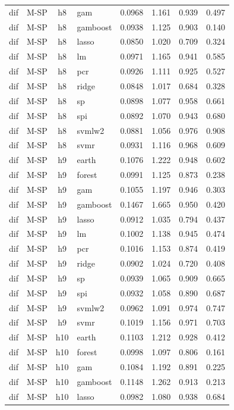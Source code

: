 \begin{ThreePartTable}
\begin{longtable}[t]{llclcccc}
dif & M-SP & h8 & gam & 0.0968 & 1.161 & 0.939 & 0.497\\
dif & M-SP & h8 & gamboost & 0.0938 & 1.125 & 0.903 & 0.140\\
dif & M-SP & h8 & lasso & 0.0850 & 1.020 & 0.709 & 0.324\\
dif & M-SP & h8 & lm & 0.0971 & 1.165 & 0.941 & 0.585\\
dif & M-SP & h8 & pcr & 0.0926 & 1.111 & 0.925 & 0.527\\
dif & M-SP & h8 & ridge & 0.0848 & 1.017 & 0.684 & 0.328\\
dif & M-SP & h8 & sp & 0.0898 & 1.077 & 0.958 & 0.661\\
dif & M-SP & h8 & spi & 0.0892 & 1.070 & 0.943 & 0.680\\
dif & M-SP & h8 & svmlw2 & 0.0881 & 1.056 & 0.976 & 0.908\\
dif & M-SP & h8 & svmr & 0.0931 & 1.116 & 0.968 & 0.609\\
\addlinespace
dif & M-SP & h9 & earth & 0.1076 & 1.222 & 0.948 & 0.602\\
dif & M-SP & h9 & forest & 0.0991 & 1.125 & 0.873 & 0.238\\
dif & M-SP & h9 & gam & 0.1055 & 1.197 & 0.946 & 0.303\\
dif & M-SP & h9 & gamboost & 0.1467 & 1.665 & 0.950 & 0.420\\
dif & M-SP & h9 & lasso & 0.0912 & 1.035 & 0.794 & 0.437\\
dif & M-SP & h9 & lm & 0.1002 & 1.138 & 0.945 & 0.474\\
dif & M-SP & h9 & pcr & 0.1016 & 1.153 & 0.874 & 0.419\\
dif & M-SP & h9 & ridge & 0.0902 & 1.024 & 0.720 & 0.408\\
dif & M-SP & h9 & sp & 0.0939 & 1.065 & 0.909 & 0.665\\
dif & M-SP & h9 & spi & 0.0932 & 1.058 & 0.890 & 0.687\\
dif & M-SP & h9 & svmlw2 & 0.0962 & 1.091 & 0.974 & 0.747\\
dif & M-SP & h9 & svmr & 0.1019 & 1.156 & 0.971 & 0.703\\
\addlinespace
dif & M-SP & h10 & earth & 0.1103 & 1.212 & 0.928 & 0.412\\
dif & M-SP & h10 & forest & 0.0998 & 1.097 & 0.806 & 0.161\\
dif & M-SP & h10 & gam & 0.1084 & 1.192 & 0.891 & 0.225\\
dif & M-SP & h10 & gamboost & 0.1148 & 1.262 & 0.913 & 0.213\\
dif & M-SP & h10 & lasso & 0.0982 & 1.080 & 0.938 & 0.684\\

\end{longtable}
\end{ThreePartTable}
